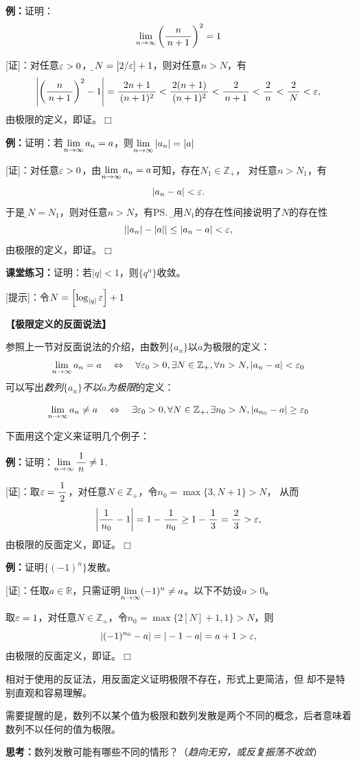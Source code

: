 {\bf 例：}证明：
$$\lim\limits_{n\to\infty}\left(\displaystyle\frac{\,{n}\,}{\,{n+1}\,}\right)^2=1$$

[证]：对任意$\varepsilon>0$，{\b 令$N=\left[2/\varepsilon\right]+1$}，则对任意$n>N$，有
$$\left|\left(\displaystyle\frac{\,{n}\,}{\,{n+1}\,}\right)^2-1\right|=\displaystyle\frac{\,{2n+1}\,}{\,{(n+1)^2}\,}<\displaystyle\frac{\,{2(n+1)}\,}{\,{(n+1)^2}\,}
<\displaystyle\frac{\,{2}\,}{\,{n+1}\,}<\displaystyle\frac{\,{2}\,}{\,{n}\,}<\displaystyle\frac{\,{2}\,}{\,{N}\,}<\varepsilon,$$
由极限的定义，即证。\hfill $\Box$

{\bf 例：}证明：若$\lim\limits_{n\to\infty} a_n=a$，则$\lim\limits_{n\to\infty}|a_n|=|a|$

[证]：对任意$\varepsilon>0$，由$\lim\limits_{n\to\infty} a_n=a$可知，存在$N_1\in\mathbb{Z}_+$，
对任意$n>N_1$，有
$$|a_n-a|<\varepsilon.$$
于是{\b 令$N=N_1$}，则对任意$n>N$，有\ps{\b 利用$N_1$的存在性间接说明了$N$的存在性}
$$||a_n|-|a||\leq|a_n-a|<\varepsilon,$$
由极限的定义，即证。\hfill $\Box$

{\bf 课堂练习：}证明：若$|q|<1$，则$\{q^n\}$收敛。

[提示]：令$N=\left[\log_{|q|}\varepsilon\right]+1$

% 

\begin{shaded}
	{\bf 【极限定义的反面说法】}
	
	参照上一节对反面说法的介绍，由数列$\{a_n\}$以$a$为极限的定义：
	$$\lim\limits_{n\to\infty} a_n= a\quad\Leftrightarrow\quad\forall\varepsilon_0>0,
	\exists N\in\mathbb{Z}_+,\forall n>N,|a_n-a|<\varepsilon_0$$
	可以写出{\it 数列$\{a_n\}$不以$a$为极限}的定义：
	\begin{tcolorbox}
		$$\lim\limits_{n\to\infty} a_n\neq a\quad\Leftrightarrow\quad\exists\varepsilon_0>0,
		\forall N\in\mathbb{Z}_+,\exists n_0>N,|a_{n_0}-a|\geq\varepsilon_0$$
	\end{tcolorbox}
	
	下面用这个定义来证明几个例子：
	
	{\bf 例：}证明：$\lim\limits_{n\to\infty}\displaystyle\frac{\,{1}\,}{\,{n}\,}\neq 1$.
	
	[证]：取$\varepsilon=\displaystyle\frac{\,{1}\,}{\,{2}\,}$，对任意$N\in\mathbb{Z}_+$，令$n_0=\max\{3,N+1\}>N$，
	从而
	$$\left|\displaystyle\frac{\,{1}\,}{\,{n_0}\,}-1\right|=1-\displaystyle\frac{\,{1}\,}{\,{n_0}\,}\geq 1-\displaystyle\frac{\,{1}\,}{\,{3}\,}=\displaystyle\frac{\,{2}\,}{\,{3}\,}>\varepsilon,$$
	由极限的反面定义，即证。\hfill $\Box$
	
	{\bf 例：}证明$\{(-1)^n\}$发散。
	
	[证]：任取$a\in\mathbb{R}$，只需证明$\lim\limits_{n\to\infty}(-1)^n\ne a$。以下不妨设$a>0$。
	
	取$\varepsilon=1$，对任意$N\in\mathbb{Z}_+$，令$n_0=\max\{2[N]+1,1\}>N$，则
	$$\left|(-1)^{n_0}-a\right|=|-1-a|=a+1>\varepsilon,$$
	由极限的反面定义，即证。\hfill $\Box$
	
	相对于使用的反证法，用反面定义证明极限不存在，形式上更简洁，但
	却不是特别直观和容易理解。
	
	需要提醒的是，数列不以某个值为极限和数列发散是两个不同的概念，后者意味着
	数列不以任何的值为极限。
	
	{\bf 思考：}数列发散可能有哪些不同的情形？\hfill（{\it 趋向无穷，或反复振荡不收敛}）
\end{shaded}

